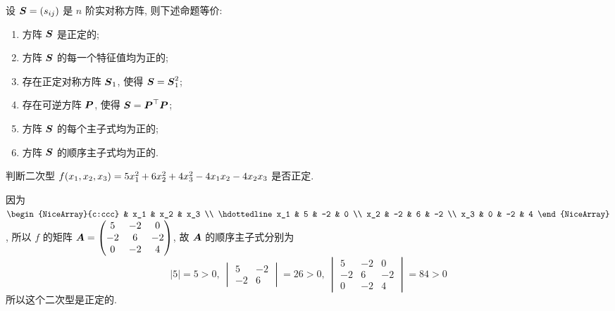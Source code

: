 \begin{theorem}[实对称方阵的等价命题]
    设 $\vb*{S}=(s_{ij})$ 是 $n$ 阶实对称方阵, 则下述命题等价:
    \begin{enumerate}[label=(\arabic{*})]
        \item 方阵 $\vb*{S}$ 是正定的;
        \item 方阵 $\vb*{S}$ 的每一个特征值均为正的;
        \item 存在正定对称方阵 $\vb*{S}_1$, 使得 $\vb*{S}=\vb*{S}_1^2$;
        \item 存在可逆方阵 $\vb*{P}$, 使得 $\vb*{S}=\vb*{P}^\top\vb*{P}$;
        \item 方阵 $\vb*{S}$ 的每个主子式均为正的;
        \item 方阵 $\vb*{S}$ 的顺序主子式均为正的.
    \end{enumerate}
\end{theorem}

\begin{example}
    判断二次型 $f\qty(x_1,x_2,x_3)=5x_1^2+6x_2^2+4x_3^2-4x_1x_2-4x_2x_3$ 是否正定.
\end{example}
\begin{solution}
    因为 $\begin{NiceArray}{c:ccc}
        & x_1 & x_2 & x_3 \\ \hdottedline
            x_1 & 5   & -2  & 0   \\
            x_2 & -2  & 6   & -2  \\
            x_3 & 0   & -2  & 4
    \end{NiceArray}$, 所以 $f$ 的矩阵 $\vb*{A}=\begin{pmatrix}
            5  & -2 & 0  \\
            -2 & 6  & -2 \\
            0  & -2 & 4
        \end{pmatrix}$, 故 $\vb*{A}$ 的顺序主子式分别为
    $$|5|=5>0,~\begin{vmatrix}
            5  & -2 \\
            -2 & 6
        \end{vmatrix}=26>0,~\begin{vmatrix}
            5  & -2 & 0  \\
            -2 & 6  & -2 \\
            0  & -2 & 4
        \end{vmatrix}=84>0$$
    所以这个二次型是正定的.
\end{solution}

